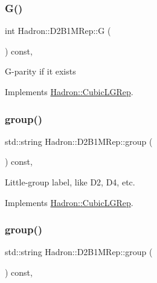 \subsubsection{\texorpdfstring{G()}{G()}\hspace{0.1cm}{\footnotesize\ttfamily [2/2]}}
{\footnotesize\ttfamily int Hadron\+::\+D2\+B1\+M\+Rep\+::G (\begin{DoxyParamCaption}{ }\end{DoxyParamCaption}) const\hspace{0.3cm}{\ttfamily [inline]}, {\ttfamily [virtual]}}

G-\/parity if it exists 

Implements \mbox{\hyperlink{structHadron_1_1CubicLGRep_ace26f7b2d55e3a668a14cb9026da5231}{Hadron\+::\+Cubic\+L\+G\+Rep}}.

\mbox{\label{structHadron_1_1D2B1MRep_a7857a8d3cbac3930e53e1e9fa474a478}} 
\subsubsection{\texorpdfstring{group()}{group()}\hspace{0.1cm}{\footnotesize\ttfamily [1/2]}}
{\footnotesize\ttfamily std\+::string Hadron\+::\+D2\+B1\+M\+Rep\+::group (\begin{DoxyParamCaption}{ }\end{DoxyParamCaption}) const\hspace{0.3cm}{\ttfamily [inline]}, {\ttfamily [virtual]}}

Little-\/group label, like D2, D4, etc. 

Implements \mbox{\hyperlink{structHadron_1_1CubicLGRep_a9bdb14b519a611d21379ed96a3a9eb41}{Hadron\+::\+Cubic\+L\+G\+Rep}}.

\mbox{\label{structHadron_1_1D2B1MRep_a7857a8d3cbac3930e53e1e9fa474a478}} 
\subsubsection{\texorpdfstring{group()}{group()}\hspace{0.1cm}{\footnotesize\ttfamily [2/2]}}
{\footnotesize\ttfamily std\+::string Hadron\+::\+D2\+B1\+M\+Rep\+::group (\begin{DoxyParamCaption}{ }\end{DoxyParamCaption}) const\hspace{0.3cm}{\ttfamily [inline]}, {\ttfamily [virtual]}}

